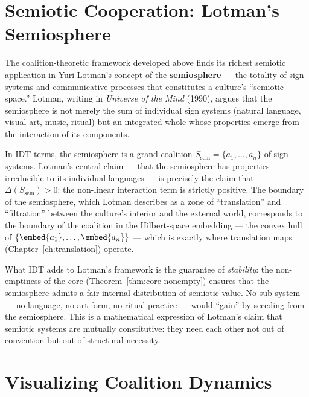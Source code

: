\section{Semiotic Cooperation: Lotman's Semiosphere}
\label{sec:lotman-semiosphere}

\begin{interpretation}
\label{interp:ch15:lotman_semiosphere}
The coalition-theoretic framework developed above finds its richest semiotic
application in Yuri Lotman's concept of the \textbf{semiosphere} --- the
totality of sign systems and communicative processes that constitutes a
culture's ``semiotic space.''  Lotman, writing in \textit{Universe of the
Mind} (1990), argues that the semiosphere is not merely the sum of individual
sign systems (natural language, visual art, music, ritual) but an integrated
whole whose properties emerge from the interaction of its components.

In IDT terms, the semiosphere is a grand coalition $S_{\text{sem}} =
\{a_1, \ldots, a_n\}$ of sign systems.  Lotman's central claim --- that the
semiosphere has properties irreducible to its individual languages --- is
precisely the claim that $\Delta(S_{\text{sem}}) > 0$: the non-linear
interaction term is strictly positive.  The boundary of the semiosphere,
which Lotman describes as a zone of ``translation'' and ``filtration'' between
the culture's interior and the external world, corresponds to the boundary of
the coalition in the Hilbert-space embedding --- the convex hull of
$\{\embed{a_1}, \ldots, \embed{a_n}\}$ --- which is exactly where translation
maps (Chapter~\ref{ch:translation}) operate.

What IDT adds to Lotman's framework is the guarantee of \emph{stability}:
the non-emptiness of the core (Theorem~\ref{thm:core-nonempty}) ensures that
the semiosphere admits a fair internal distribution of semiotic value.  No
sub-system --- no language, no art form, no ritual practice --- would ``gain''
by seceding from the semiosphere.  This is a mathematical expression of
Lotman's claim that semiotic systems are mutually constitutive: they need
each other not out of convention but out of structural necessity.
\end{interpretation}

\section{Visualizing Coalition Dynamics}

